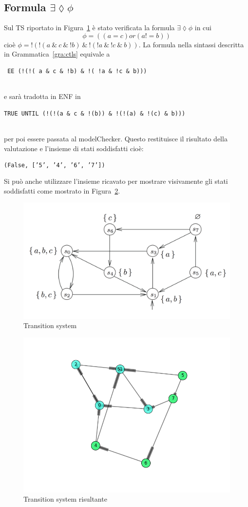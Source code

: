 \documentclass[a4paper, 10pt]{article}
\numberwithin{equation}{theor}
\begin{document}
\subsection{Formula $ \exists \lozenge  \phi$}
Sul \ac{TS} riportato in Figura~\ref{ts6} è stato verificata la formula $ \exists \lozenge  \phi$ in cui
$$ \phi = ((a = c) or (a != b))$$
cioè  $\phi = !(!(a \ \& \ c \ \& \ !b) \ \& \ !(!a \ \& \ !c \ \& \ b))$.
La formula nella sintassi descritta in Grammatica~\ref{gra:ctls} equivale a
\\
\centerline{\texttt{ EE (!(!( a \& c \& !b) \& !( !a \& !c \& b)))}}
\\ e sarà tradotta in \ac{ENF} in \\
\centerline{\texttt{TRUE UNTIL (!(!(a \& c \& !(b)) \& !(!(a) \& !(c) \& b)))}}
\\ per poi essere passata al modelChecker. Questo restituisce il risultato della valutazione e l'insieme di stati soddisfatti cioè:
\\
\centerline{\texttt{(False, ['5', '4', '6', '7'])}}
Si può anche utilizzare l'insieme ricavato per mostrare visivamente gli stati soddisfatti come mostrato in Figura~\ref{tsResult1}.
\begin{figure}
  \includegraphics[width=\linewidth]{img/ts.png}
  \caption{Transition system}
  \label{ts6}
\end{figure}
\begin{figure}
  \includegraphics[width=\linewidth]{img/tsResult.png}
  \caption{Transition system risultante}
  \label{tsResult1}
\end{figure}
\end{document}
